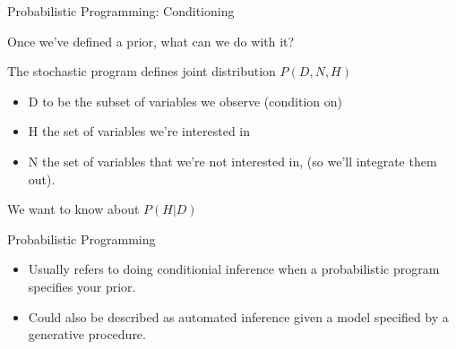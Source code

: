 \begin{frame}{Probabilistic Programming: Conditioning}
  \begin{block}{Once we've defined a prior, what can we do with it?}  

  The stochastic program defines joint distribution $P(D,N,H)$
  \begin{itemize}
    \item D to be the subset of variables we observe (condition on)
    \item H the set of variables we're interested in
    \item N the set of variables that we're not interested in, (so we'll integrate them out).
  \end{itemize}
  We want to know about $P(H|D)$
  \end{block}
  \begin{block}{Probabilistic Programming}
      \begin{itemize}
        \item Usually refers to doing conditionial inference when a probabilistic program specifies your prior.
        \item Could also be described as automated inference given a model specified by a generative procedure.
      \end{itemize}
    \end{block}
\end{frame}

